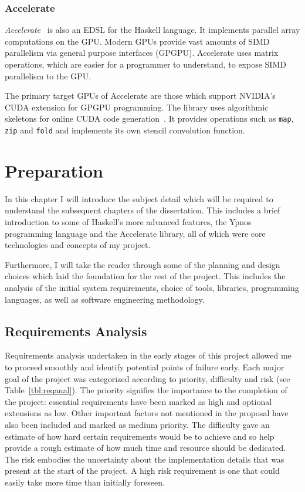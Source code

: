 \documentclass[12pt,a4paper,twoside]{scrbook}
\begin{document}
\subsection{Accelerate}

\emph{Accelerate}~\cite{acc-damp11} is also an EDSL for the Haskell language.
It implements parallel array computations on the GPU. Modern GPUs provide vast
amounts of SIMD parallelism via general purpose interfaces (GPGPU). Accelerate
uses matrix operations, which are easier for a programmer to understand, to
expose SIMD parallelism to the GPU.

The primary target GPUs of Accelerate are those which support NVIDIA's CUDA
extension for GPGPU programming. The library uses algorithmic skeletons for
online CUDA code generation~\cite{cole1989}. It provides operations such as
\texttt{map}, \texttt{zip} and \texttt{fold} and implements its own stencil
convolution function.


\chapter{Preparation}

In this chapter I will introduce the subject detail which will be required to
understand the subsequent chapters of the dissertation. This includes a brief
introduction to some of Haskell's more advanced features, the Ypnos programming
language and the Accelerate library, all of which were core technologies and
concepts of my project.

Furthermore, I will take the reader through some of the planning and design
choices which laid the foundation for the rest of the project. This includes the
analysis of the initial system requirements, choice of tools, libraries,
programming languages, as well as software engineering methodology.

\section{Requirements Analysis}

Requirements analysis undertaken in the early stages of this project allowed me
to proceed smoothly and identify potential points of failure early. Each major
goal of the project was categorized according to priority, difficulty and
risk (see Table~\ref{tbl:reqanal}). The priority signifies the importance to the completion of the project:
essential requirements have been marked as high and optional extensions as
low. Other important factors not mentioned in the proposal have also been
included and marked as medium priority. The difficulty gave an estimate of how
hard certain requirements would be to achieve and so help provide a rough
estimate of how much time and resource should be dedicated. The risk embodies
the uncertainty about the implementation details that was present at the start
of the project. A high risk requirement is one that could easily take more time
than initially foreseen.
\end{document}
